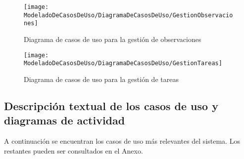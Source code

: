     \begin{figure}[H]
		\centering
		\texttt{[image: ModeladoDeCasosDeUso/DiagramaDeCasosDeUso/GestionObservaciones]}
		\caption{Diagrama de casos de uso para la gestión de observaciones}
	\label{fig:GestionObservaciones}
	\end{figure}
	\begin{figure}[H]
		\centering
		\texttt{[image: ModeladoDeCasosDeUso/DiagramaDeCasosDeUso/GestionTareas]}
		\caption{Diagrama de casos de uso para la gestión de tareas}
	\label{fig:GestionTareas}
	\end{figure}
	\clearpage %
	\subsection{Descripción textual de los casos de uso y diagramas de actividad}
		A continuación se encuentran los casos de uso más relevantes del sistema. Los restantes pueden ser consultados en el Anexo.
		
		
		
		
		
		
		

		
		
		

		

		
		
		
		
		
		

